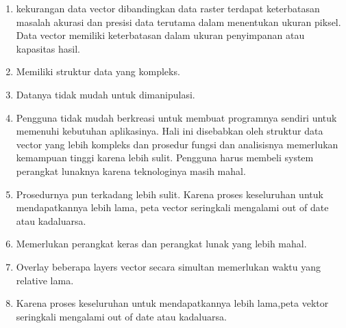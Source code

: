 \begin{enumerate}
\item
kekurangan data vector dibandingkan data raster
terdapat keterbatasan masalah akurasi dan presisi data terutama dalam menentukan ukuran piksel. Data vector memiliki keterbatasan dalam ukuran penyimpanan atau kapasitas hasil.
\item Memiliki struktur data yang kompleks.
\item Datanya tidak mudah untuk dimanipulasi.
\item Pengguna tidak mudah berkreasi untuk membuat programnya sendiri untuk memenuhi kebutuhan aplikasinya. Hali ini disebabkan oleh struktur data vector yang lebih kompleks dan prosedur fungsi dan analisisnya memerlukan kemampuan tinggi karena lebih sulit. Pengguna harus membeli system perangkat lunaknya karena teknologinya masih mahal.
\item Prosedurnya pun terkadang lebih sulit. Karena proses keseluruhan untuk mendapatkannya lebih lama, peta vector seringkali mengalami out of date atau kadaluarsa.
\item Memerlukan perangkat keras dan perangkat lunak yang lebih mahal.
\item Overlay beberapa layers vector secara simultan memerlukan waktu yang relative lama.
\item Karena proses keseluruhan untuk mendapatkannya lebih lama,peta vektor seringkali mengalami out of date atau kadaluarsa.
\end{enumerate}

